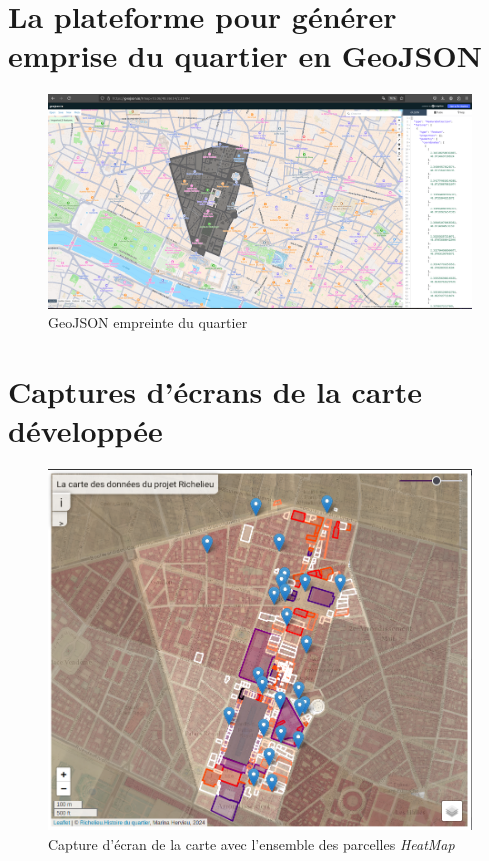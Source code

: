 \documentclass[openany, a4paper, 12pt, twoside]{book}
\begin{document}
\chapter{La plateforme pour générer emprise du quartier en GeoJSON}
\begin{figure}
    \centering
    \includegraphics[width=1\linewidth]{annexes/geojson.png}
    \caption{GeoJSON empreinte du quartier}
    \label{fig:geojson-quartier}
\end{figure}
\chapter{Captures d'écrans de la carte développée}
\begin{figure}
    \centering
    \includegraphics[width=1\linewidth]{annexes/carte-parcelle.png}
    \caption{Capture d'écran de la carte avec l'ensemble des parcelles \textit{HeatMap}}
    \label{fig:carte-parcelle}
\end{figure}
\end{document}
